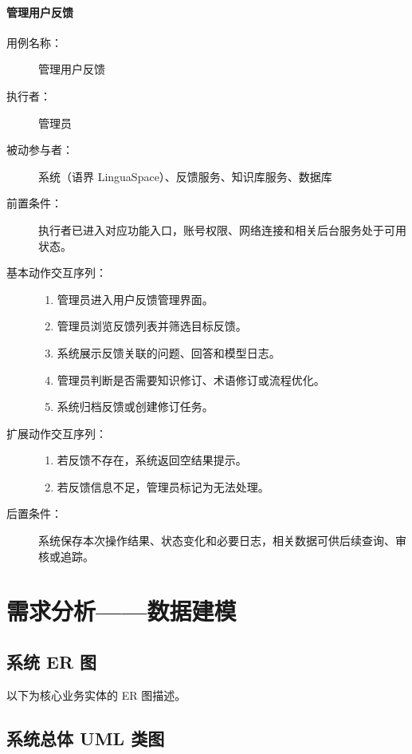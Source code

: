 \paragraph{管理用户反馈}
\begin{description}
  \item[用例名称：] 管理用户反馈
  \item[执行者：] 管理员
  \item[被动参与者：] 系统（语界 LinguaSpace）、反馈服务、知识库服务、数据库
  \item[前置条件：] 执行者已进入对应功能入口，账号权限、网络连接和相关后台服务处于可用状态。
  \item[基本动作交互序列：]
  \begin{enumerate}
    \item 管理员进入用户反馈管理界面。
    \item 管理员浏览反馈列表并筛选目标反馈。
    \item 系统展示反馈关联的问题、回答和模型日志。
    \item 管理员判断是否需要知识修订、术语修订或流程优化。
    \item 系统归档反馈或创建修订任务。
  \end{enumerate}
  \item[扩展动作交互序列：]
  \begin{enumerate}
    \item[2a.] 若反馈不存在，系统返回空结果提示。
    \item[4a.] 若反馈信息不足，管理员标记为无法处理。
  \end{enumerate}
  \item[后置条件：] 系统保存本次操作结果、状态变化和必要日志，相关数据可供后续查询、审核或追踪。
\end{description}

\section{需求分析——数据建模}

\subsection{系统 ER 图}

以下为核心业务实体的 ER 图描述。


\subsection{系统总体 UML 类图}

